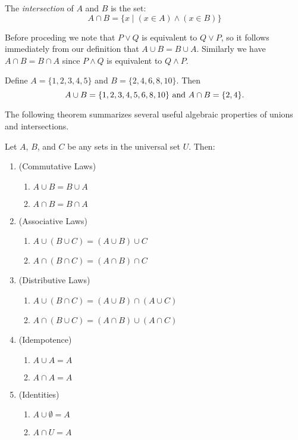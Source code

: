 \begin{definition}
The \emph{intersection} of $A$ and $B$ is the set: \[ A\cap B=\{ x\mid (x\in A)\land(x\in B)\}\]
\end{definition}

\noindent
Before proceding we note that $P\lor Q$ is equivalent to $Q\lor P$, so it follows immediately from our definition that $A\cup B=B\cup A$. Similarly we have $A\cap B=B\cap A$ since $P\land Q$ is equivalent to $Q\land P$.

\begin{example}
Define $A=\{ 1,2,3,4,5\}$ and $B=\{ 2,4,6,8,10\}$.  Then \[A\cup B=\{
1,2,3,4,5,6,8,10\} \hbox{ and } A\cap B=\{ 2,4\}.\]
\end{example}

The following theorem summarizes several useful algebraic properties of unions and intersections.
\begin{thrm}\label{sets:basics}
Let $A$, $B$, and $C$ be any sets in the universal set $U$.  Then:
\begin{enumerate}
\item (Commutative Laws)
\begin{enumerate}
\item $A\cup B=B\cup A$
\item $A\cap B=B\cap A$
\end{enumerate}

\item\label{basics:assoc} (Associative Laws)
\begin{enumerate}
\item $A\cup (B\cup C)=(A\cup B)\cup C$
\item $A\cap (B\cap C)=(A\cap B)\cap C$
\end{enumerate}

\item\label{basics:distr} (Distributive Laws)
\begin{enumerate}
\item $A\cup(B\cap C)=(A\cup B)\cap(A\cup C)$
\item $A\cap(B\cup C)=(A\cap B)\cup(A\cap C)$
\end{enumerate}

\item\label{basics:idem} (Idempotence)
\begin{enumerate}
\item $A\cup A=A$
\item $A\cap A=A$
\end{enumerate}

\item\label{basics:ident} (Identities)
\begin{enumerate}
\item $A\cup\emptyset=A$
\item $A\cap U=A$
\end{enumerate}
\end{enumerate}
\end{thrm}

